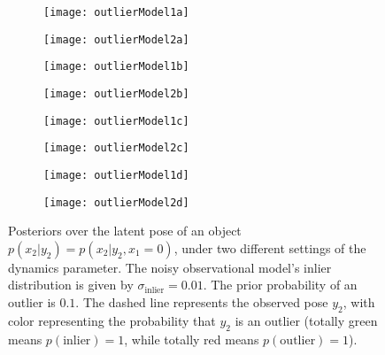 \begin{figure}[H]
  \begin{subfigure}[b]{0.5\textwidth}
    \centering
    \texttt{[image: outlierModel1a]}
  \end{subfigure}%
  \begin{subfigure}[b]{0.5\textwidth}
    \centering
    \texttt{[image: outlierModel2a]}
  \end{subfigure}
  \begin{subfigure}[b]{0.5\textwidth}
    \centering
    \texttt{[image: outlierModel1b]}
  \end{subfigure}%
  \begin{subfigure}[b]{0.5\textwidth}
    \centering
    \texttt{[image: outlierModel2b]}
  \end{subfigure}
  \begin{subfigure}[b]{0.5\textwidth}
    \centering
    \texttt{[image: outlierModel1c]}
  \end{subfigure}%
  \begin{subfigure}[b]{0.5\textwidth}
    \centering
    \texttt{[image: outlierModel2c]}
  \end{subfigure}
  \begin{subfigure}[b]{0.5\textwidth}
    \centering
    \texttt{[image: outlierModel1d]}
  \end{subfigure}%
  \begin{subfigure}[b]{0.5\textwidth}
    \centering
    \texttt{[image: outlierModel2d]}
  \end{subfigure}
  \caption{
    Posteriors over the latent pose of an object $p(x_2 | y_2) = p(x_2 | y_2, x_1 = 0)$, under two different settings of the dynamics parameter.
    The noisy observational model's inlier distribution is given by $\sigma_\mathrm{inlier} = 0.01$.
    The prior probability of an outlier is $0.1$.
    The dashed line represents the observed pose $y_2$, with color representing the probability that $y_2$ is an outlier (totally green means $p(\mathrm{inlier}) = 1$, while totally red means $p(\mathrm{outlier}) = 1$).
  }
  \label{fig:outlierModel}
\end{figure}

